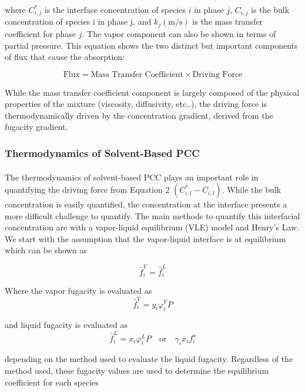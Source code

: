 \documentclass[12pt, letterpaper]{article}
\begin{document}
where $C_{i,j}^{*}$ is the interface concentration of species $i$ in phase $j$, $C_{i,j}$ is the bulk concentration of species {i} in phase {j}, and $k_j(\si{\meter\per\second})$ is the mass transfer coefficient for phase $j$. The vapor component can also be shown in terms of partial pressure. This equation shows the two distinct but important components of flux that cause the absorption:

\begin{equation}
\text{Flux} = \text{Mass Transfer Coefficient} \times \text{Driving Force}
\end{equation}

While the mass transfer coefficient component is largely composed of the physical properties of the mixture (viscosity, diffusivity, etc..), the driving force is thermodynamically driven by the concentration gradient, derived from the fugacity gradient.

\subsubsection{Thermodynamics of Solvent-Based PCC}
\paragraph{}
The thermodynamics of solvent-based PCC plays an important role in quantifying the driving force from Equation 2 $(C_{i,l}^{*}-C_{i,l})$. While the bulk concentration is easily quantified, the concentration at the interface presents a more difficult challenge to quantify. The main methods to quantify this interfacial concentration are with a vapor-liquid equilibrium (VLE) model and Henry's Law.  We start with the assumption that the vapor-liquid interface is at equilibrium which can be shown as

\begin{equation}
  \hat{f}_i^V=\hat{f}_i^L  
\end{equation}

Where the vapor fugacity is evaluated as
\begin{equation}
\hat{f}_i^V=y_i \varphi_i^V P
\end{equation}

and liquid fugacity is evaluated as
\begin{equation}
\hat{f}_i^L=x_i \varphi_i^L P \quad \text{or} \quad \gamma_i x_i f_i^o
\end{equation}

depending on the method used to evaluate the liquid fugacity.  Regardless of the method used, these fugacity values are used to determine the equilibrium coefficient for each species
\end{document}
